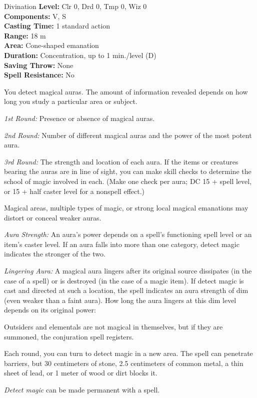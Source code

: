{Divination}
{
	\textbf{Level:}
	Clr 0, Drd 0, Tmp 0, Wiz 0\\
	\textbf{Components:}
	V, S\\
	\textbf{Casting Time:}
	1 standard action\\
	\textbf{Range:}
	18 m\\
	\textbf{Area:}
	Cone-shaped emanation\\
	\textbf{Duration:}
	Concentration, up to 1 min./level (D)\\
	\textbf{Saving Throw:}
	None\\
	\textbf{Spell Resistance:}
	No\\
}
{
	You detect magical auras. The amount of information revealed depends on how long you study a particular area or subject.

	\textit{1st Round:}
	Presence or absence of magical auras.

	\textit{2nd Round:}
	Number of different magical auras and the power of the most potent aura.

	\textit{3rd Round:}
	The strength and location of each aura. If the items or creatures bearing the auras are in line of sight, you can make  skill checks to determine the school of magic involved in each. (Make one check per aura; DC 15 + spell level, or 15 + half caster level for a nonspell effect.)

	Magical areas, multiple types of magic, or strong local magical emanations may distort or conceal weaker auras.

	\textit{Aura Strength:}
	An aura's power depends on a spell's functioning spell level or an item's caster level. If an aura falls into more than one category, detect magic indicates the stronger of the two.

	\textit{Lingering Aura:}
	A magical aura lingers after its original source dissipates (in the case of a spell) or is destroyed (in the case of a magic item). If detect magic is cast and directed at such a location, the spell indicates an aura strength of dim (even weaker than a faint aura). How long the aura lingers at this dim level depends on its original power:


	Outsiders and elementals are not magical in themselves, but if they are summoned, the conjuration spell registers.

	Each round, you can turn to detect magic in a new area. The spell can penetrate barriers, but 30 centimeters of stone, 2.5 centimeters of common metal, a thin sheet of lead, or 1 meter of wood or dirt blocks it.

	\emph{Detect magic} can be made permanent with a  spell.

}
